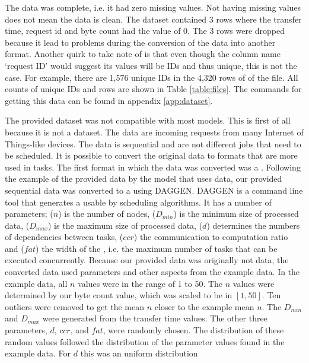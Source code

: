 The data was complete, i.e. it had zero missing values. Not having missing
values does not mean the data is clean. The dataset contained 3 rows where the
transfer time, request id and byte count had the value of 0. The 3 rows were
dropped because it lead to problems during the conversion of the data into
another format. Another quirk to take note of is that even though the column
name `request ID' would suggest its values will be IDs and thus unique, this
is not the case. For example, there are 1,576 unique IDs in the 4,320 rows of
of the  file. All counts of unique IDs and rows are
shown in Table \ref{table:files}. The commands for getting this data can be
found in appendix \ref{app:dataset}.




The provided dataset was not compatible with most models. This is first of all
because it is not a \jss dataset. The data are incoming requests from many
Internet of Things-like devices. The data is sequential and are not different
jobs that need to be scheduled. It is possible to convert the original data to
formats that are more used in \jss tasks. The first format in which the data
was converted was a \DAG. Following the example of the provided data by the
model that uses \DAG data\footnotemark, our provided sequential data was
converted to a \DAG using DAGGEN. DAGGEN
is a command line tool that generates a \DAG usable by scheduling algorithms.
It has a number of parameters;  ($n$) is the number of nodes,
 ($D_{min}$) is the minimum size of processed data,
 ($D_{max}$) is the maximum size of processed data,
 ($d$) determines the numbers of dependencies between tasks,
 ($ccr$) the communication to computation ratio and 
($fat$) the width of the \DAG, i.e. the maximum number of tasks that can be
executed concurrently. Because our provided data was originally not \jss data,
the converted data used parameters and other aspects from the example data. In
the example data, all $n$ values were in the range of 1 to 50. The $n$ values
were determined by our byte count value, which was scaled to be in $[1, 50]$.
Ten outliers were removed to get the mean $n$ closer to the example mean $n$.
The $D_{min}$ and $D_{max}$ were generated from the transfer time values. The
other three parameters, $d$, $ccr$, and $fat$, were randomly chosen. The
distribution of these random values followed the distribution of the parameter
values found in the example data. For $d$ this was an uniform distribution
